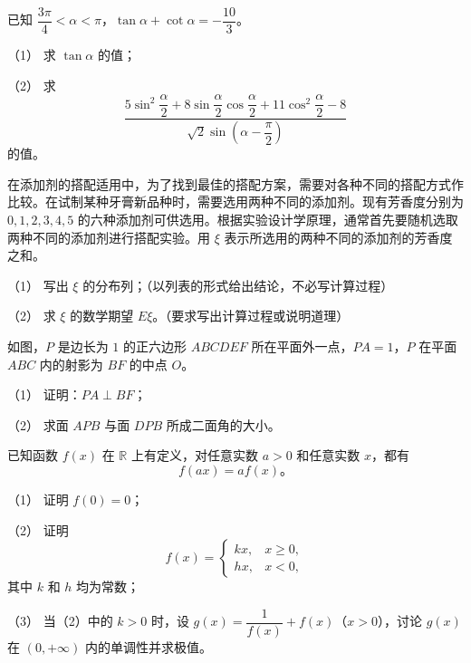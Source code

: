 \begin{question}
已知 $\dfrac{3\pi}{4}<\alpha<\pi$，$\tan\alpha+\cot\alpha=-\dfrac{10}{3}$。

（1） 求 $\tan\alpha$ 的值；

（2） 求
\nopagebreak[4]
\[
\dfrac{5\sin^2\dfrac{\alpha}{2}+8\sin\dfrac{\alpha}{2}\cos\dfrac{\alpha}{2}+11\cos^2\dfrac{\alpha}{2}-8}{\sqrt{2}\sin\left(\alpha-\dfrac{\pi}{2}\right)}
\]
的值。

\end{question}
\begin{question}
在添加剂的搭配适用中，为了找到最佳的搭配方案，需要对各种不同的搭配方式作比较。在试制某种牙膏新品种时，需要选用两种不同的添加剂。现有芳香度分别为 $0,1,2,3,4,5$ 的六种添加剂可供选用。根据实验设计学原理，通常首先要随机选取两种不同的添加剂进行搭配实验。用 $\xi$ 表示所选用的两种不同的添加剂的芳香度之和。

（1） 写出 $\xi$ 的分布列；（以列表的形式给出结论，不必写计算过程）

（2） 求 $\xi$ 的数学期望 $E\xi$。（要求写出计算过程或说明道理）

\Needspace{0.4\textheight}
\end{question}
\begin{question}
如图，$P$ 是边长为 $1$ 的正六边形 $ABCDEF$ 所在平面外一点，$PA=1$，$P$ 在平面 $ABC$ 内的射影为 $BF$ 的中点 $O$。

（1） 证明：$PA\perp BF$；

（2） 求面 $APB$ 与面 $DPB$ 所成二面角的大小。
\nopagebreak[4]
\begin{center}\end{center}
\nopagebreak[4]
\end{question}
\begin{question}
已知函数 $f(x)$ 在 $\mathbb R$ 上有定义，对任意实数 $a>0$ 和任意实数 $x$，都有
\nopagebreak[4]
\[
f(ax)=af(x)\text{。}
\]

（1） 证明 $f(0)=0$；

（2） 证明
\nopagebreak[4]
\[
f(x)=\begin{cases}
kx,&x\geqslant0,\\
hx,&x<0,
\end{cases}
\]
其中 $k$ 和 $h$ 均为常数；

（3） 当（2）中的 $k>0$ 时，设 $g(x)=\dfrac{1}{f(x)}+f(x)$（$x>0$），讨论 $g(x)$ 在 $(0,+\infty)$ 内的单调性并求极值。

\end{question}
